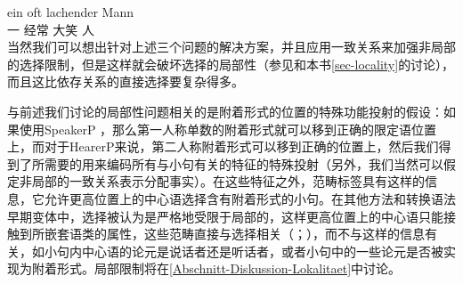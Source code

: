 \ex
\gll ein oft lachender Mann\\
     一 经常 大笑 人\\
\zl     
当然我们可以想出针对上述三个问题的解决方案，并且应用一致关系来加强非局部的选择限制，但是这样就会破坏选择的局部性（参见\citealp[]{Ernst92a}和本书\ref{sec-locality}的讨论），而且这比依存关系的直接选择要复杂得多。

与前述我们讨论的局部性问题相关的是附着形式的位置的特殊功能投射的假设：如果使用SpeakerP ，那么第一人称单数的附着形式就可以移到正确的限定语位置上，而对于HearerP来说，第二人称附着形式可以移到正确的位置上\citep[]{Poletto2000a-u}，然后我们得到了所需要的用来编码所有与小句有关的特征的特殊投射（另外，我们当然可以假定非局部的一致关系表示分配事实）。在这些特征之外，范畴标签具有这样的信息，它允许更高位置上的中心语选择含有附着形式的小句。在其他方法和转换语法早期变体中，选择被认为是严格地受限于局部的，这样更高位置上的中心语只能接触到所嵌套语类的属性，这些范畴直接与选择相关（\citealp[]{Abraham2005a}；\citealp{Sag2007a}），而不与这样的信息有关，如小句内中心语的论元是说话者还是听话者，或者小句中的一些论元是否被实现为附着形式。局部限制将在\ref{Abschnitt-Diskussion-Lokalitaet}中讨论。

